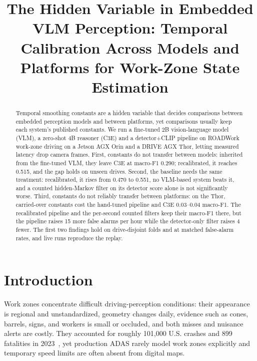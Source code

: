 \documentclass[conference]{IEEEtran}
\begin{document}

\title{The Hidden Variable in Embedded VLM Perception: Temporal Calibration Across Models and Platforms for Work-Zone State Estimation}

\author{}
\maketitle

\begin{abstract}
Temporal smoothing constants are a hidden variable that decides comparisons between embedded perception models and between platforms, yet comparisons usually keep each system's published constants.  We run a fine-tuned 2B vision-language model (VLM), a zero-shot 4B reasoner (C3E) and a detector+CLIP pipeline on ROADWork work-zone driving on a Jetson AGX Orin and a DRIVE AGX Thor, letting measured latency drop camera frames.  First, constants do not transfer between models: inherited from the fine-tuned VLM, they leave C3E at macro-F1 0.290; recalibrated, it reaches 0.515, and the gap holds on unseen drives.  Second, the baseline needs the same treatment: recalibrated, it rises from 0.470 to 0.551, no VLM-based system beats it, and a counted hidden-Markov filter on its detector score alone is not significantly worse.  Third, constants do not reliably transfer between platforms: on the Thor, carried-over constants cost the hand-tuned pipeline and C3E 0.03--0.04 macro-F1.  The recalibrated pipeline and the per-second counted filters keep their macro-F1 there, but the pipeline raises 15 more false alarms per hour while the detector-only filter raises 4 fewer.  The first two findings hold on drive-disjoint folds and at matched false-alarm rates, and live runs reproduce the replay.
\end{abstract}

\section{Introduction}
\label{sec:intro}

Work zones concentrate difficult driving-perception conditions: their appearance is regional and unstandardized, geometry changes daily, evidence such as cones, barrels, signs, and workers is small or occluded, and both misses and nuisance alerts are costly.  They accounted for roughly 101{,}000 U.S. crashes and 899 fatalities in 2023~\cite{nhtsa2023}, yet production ADAS rarely model work zones explicitly and temporary speed limits are often absent from digital maps.
\end{document}
